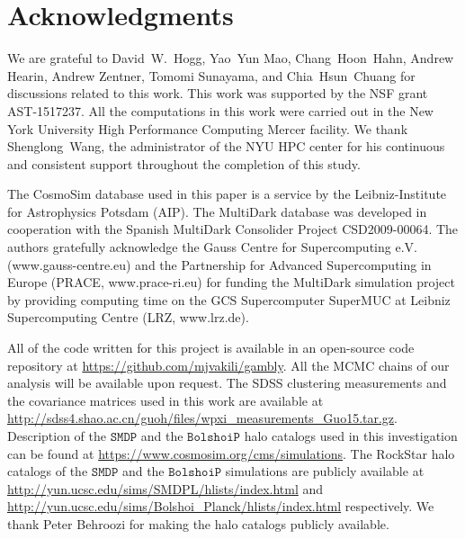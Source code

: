 \documentclass[12pt, preprint]{aastex}
\begin{document}
\section*{Acknowledgments}

We are grateful to David~W.~Hogg, Yao~Yun Mao, Chang~Hoon~Hahn, Andrew Hearin, Andrew Zentner, Tomomi Sunayama, and Chia~Hsun~Chuang for
discussions related to this work. This work was supported by the NSF grant AST-1517237. All the computations in this work were carried out in the New York University High Performance Computing Mercer facility. We thank Shenglong~Wang, the administrator of the NYU HPC center for his continuous and consistent support throughout the completion of this study. 

The CosmoSim database used in this paper is a service by the Leibniz-Institute for Astrophysics Potsdam (AIP). The MultiDark database was developed in cooperation with the Spanish MultiDark Consolider Project CSD2009-00064. The authors gratefully acknowledge the Gauss Centre for Supercomputing e.V. (www.gauss-centre.eu) and the Partnership for Advanced Supercomputing in Europe (PRACE, www.prace-ri.eu) for funding the MultiDark simulation project by providing computing time on the GCS Supercomputer SuperMUC at Leibniz Supercomputing Centre (LRZ, www.lrz.de).

All of the code written for this project is available in an open-source
code repository at \url{https://github.com/mjvakili/gambly}. All the MCMC chains of our analysis will be available upon request.
The SDSS clustering measurements and the covariance matrices used in this work are available at \url{http://sdss4.shao.ac.cn/guoh/files/wpxi_measurements_Guo15.tar.gz}. Description of the $\mathtt{SMDP}$ and the $\mathtt{BolshoiP}$ halo catalogs used in this investigation can be found at \url{https://www.cosmosim.org/cms/simulations}. The RockStar halo catalogs of the $\mathtt{SMDP}$ and the $\mathtt{BolshoiP}$ simulations are publicly available at \url{http://yun.ucsc.edu/sims/SMDPL/hlists/index.html} and \url{http://yun.ucsc.edu/sims/Bolshoi_Planck/hlists/index.html} respectively. We thank Peter Behroozi for making the halo catalogs publicly available.



\clearpage

\end{document}
